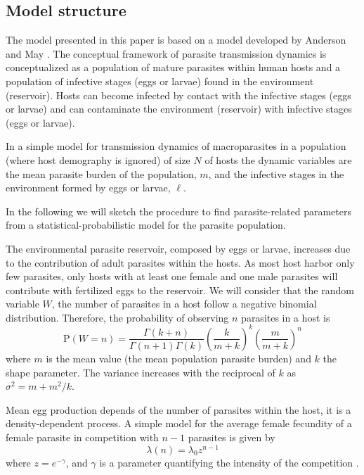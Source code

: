 \documentclass[12pt,a4paper]{article}
\theoremstyle{plain}%
\theoremstyle{definition}
\theoremstyle{remark}
\begin{document}
\subsection{Model structure}
\label{ss:structure}
The model presented in this paper is based on a model developed by Anderson and May \citep{anderson1992infectious,anderson1985helminth}.
The conceptual framework of parasite transmission dynamics is conceptualized as a population of mature parasites within human hosts and a population of infective stages (eggs or larvae) found in the environment (reservoir).
Hosts can become infected by contact with the infective stages (eggs or larvae) and can contaminate the environment (reservoir) with infective stages (eggs or larvae).

In a simple model for transmission dynamics of macroparasites in a population (where host demography is ignored) of size $N$ of hosts 
the dynamic variables  are the mean parasite burden of the population, $m$, and the infective stages in the environment formed by eggs or larvae, $\ell$.

In the following we will sketch the procedure to find parasite-related parameters from a statistical-probabilistic model for the parasite population.

The environmental parasite reservoir, composed by eggs or larvae, increases due to the contribution of adult parasites within the hosts. As most host harbor only few parasites, only hosts with at least one female and one male parasites will contribute with fertilized eggs to the reservoir. We will consider that the random variable $W$, the number of parasites in a host follow a negative binomial distribution. 
Therefore, the probability of observing $n$ parasites in a host is
\begin{equation}\label{disnb}
\mathrm{P}(W=n)=\frac{\Gamma(k+n)}{\Gamma(n+1)\Gamma(k)}\left( \frac{k}{m+k}\right) ^{k} \left( \frac{m}{m+k}\right) ^n
\end{equation}
where $m$ is the mean value (the mean population parasite burden) and $k$ the shape parameter. 
The variance increases with the reciprocal of $k$ as $\sigma^2=m+m^2/k$.

Mean egg production depends of the number of parasites within the host, it is a density-dependent process. 
A simple model for the average female fecundity of a female parasite in competition with $n-1$ parasites is given by 
$$\lambda(n)=\lambda_0 z^{n-1}$$ where $z=e^{-\gamma}$, and $\gamma$ is a parameter quantifying the intensity of the competition \cite{hall2000geographical}. 
\end{document}

